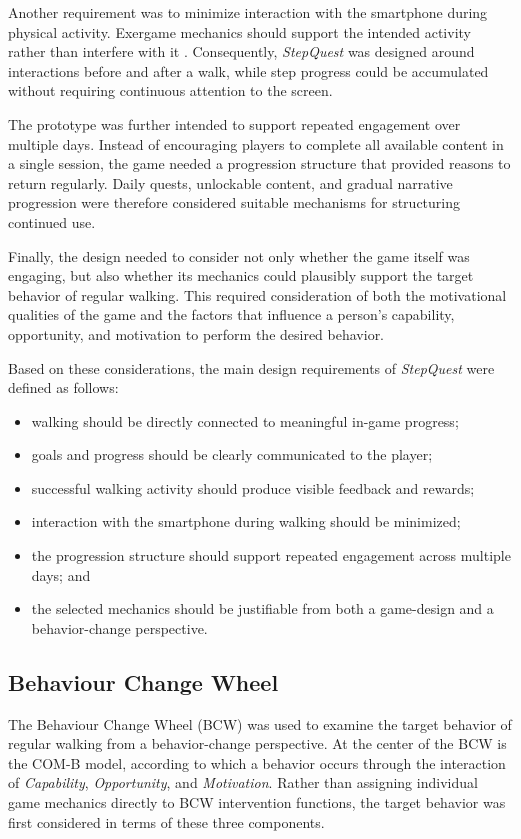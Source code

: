 Another requirement was to minimize interaction with the smartphone during physical activity. Exergame mechanics should support the intended activity rather than interfere with it \cite{10.1145/1321261.1321313}. Consequently, \textit{StepQuest} was designed around interactions before and after a walk, while step progress could be accumulated without requiring continuous attention to the screen.

The prototype was further intended to support repeated engagement over multiple days. Instead of encouraging players to complete all available content in a single session, the game needed a progression structure that provided reasons to return regularly. Daily quests, unlockable content, and gradual narrative progression were therefore considered suitable mechanisms for structuring continued use.

Finally, the design needed to consider not only whether the game itself was engaging, but also whether its mechanics could plausibly support the target behavior of regular walking. This required consideration of both the motivational qualities of the game and the factors that influence a person's capability, opportunity, and motivation to perform the desired behavior.

Based on these considerations, the main design requirements of \textit{StepQuest} were defined as follows:

\begin{itemize}
	\item walking should be directly connected to meaningful in-game progress;
	\item goals and progress should be clearly communicated to the player;
	\item successful walking activity should produce visible feedback and rewards;
	\item interaction with the smartphone during walking should be minimized;
	\item the progression structure should support repeated engagement across multiple days; and
	\item the selected mechanics should be justifiable from both a game-design and a behavior-change perspective.
\end{itemize}

\subsection{Behaviour Change Wheel}

The Behaviour Change Wheel (BCW) was used to examine the target behavior of regular walking from a behavior-change perspective. At the center of the BCW is the COM-B model, according to which a behavior occurs through the interaction of \textit{Capability}, \textit{Opportunity}, and \textit{Motivation}. \cite{bcw2011} Rather than assigning individual game mechanics directly to BCW intervention functions, the target behavior was first considered in terms of these three components.

